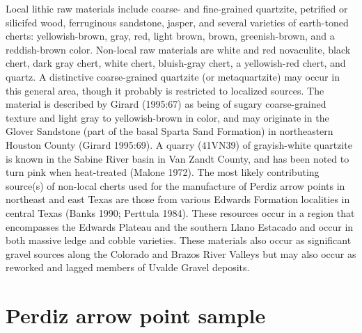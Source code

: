 \documentclass[review]{elsarticle}
\begin{document}
Local lithic raw materials include coarse- and fine-grained quartzite, petrified or silicifed wood, ferruginous sandstone, jasper, and several varieties of earth-toned cherts: yellowish-brown, gray, red, light brown, brown, greenish-brown, and a reddish-brown color. Non-local raw materials are white and red novaculite, black chert, dark gray chert, white chert, bluish-gray chert, a yellowish-red chert, and quartz. A distinctive coarse-grained quartzite (or metaquartzite) may occur in this general area, though it probably is restricted to localized sources. The material is described by Girard (1995:67) as being of sugary coarse-grained texture and light gray to yellowish-brown in color, and may originate in the Glover Sandstone (part of the basal Sparta Sand Formation) in northeastern Houston County (Girard 1995:69). A quarry (41VN39) of grayish-white quartzite is known in the Sabine River basin in Van Zandt County, and has been noted to turn pink when heat-treated (Malone 1972).
The most likely contributing source(s) of non-local cherts used for the manufacture of Perdiz arrow points in northeast and east Texas are those from various Edwards Formation localities in central Texas (Banks 1990; Perttula 1984). These resources occur in a region that encompasses the Edwards Plateau and the southern Llano Estacado and occur in both massive ledge and cobble varieties. These materials also occur as significant gravel sources along the Colorado and Brazos River Valleys but may also occur as reworked and lagged members of Uvalde Gravel deposits.

\section*{Perdiz arrow point sample}
\end{document}
